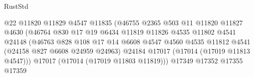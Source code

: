 \begin{lexlean}{RustStd}
\begin{coremodule}
{\begin{coremodule}
{{{{{{{{{{{{{{{{{{{{{{{{{{{{{{{{{{{{{{{{{{{{{{{{{{{{{{{                                                @22
                                                @11820
                                                @11829
                                                @4547
                                                @11835
                                                (@46755
                                                  @2365
                                                  @503
                                                  @11
                                                  @11820
                                                  @11827
                                                  @4630
                                                  (@46764
                                                    @830
                                                    @17
                                                    @19
                                                    @6434
                                                    @11819
                                                    @11826
                                                    @4535
                                                    @11802
                                                    @4541
                                                    @24148
                                                    (@46763
                                                      @828
                                                      @108
                                                      @17
                                                      @14
                                                      @6608
                                                      @4547
                                                      @4560
                                                      @4535
                                                      @11812
                                                      @4541
                                                      (@24158 @827 @6608 @24959 @24963)
                                                      @24184
                                                      @17017
                                                      (@17014 (@17019 @11813 @4547)))
                                                    @17017
                                                    (@17014 (@17019 @11803 @11819)))
                                                  @17349
                                                  @17352
                                                  @17355
                                                  @17359
}}}}}}}}}}}}}}}}}}}}}}}}}}}}}}}}}}}}}}}}}}}}}}}}}}}}}}}
\end{coremodule}}
\end{coremodule}
\end{lexlean}
